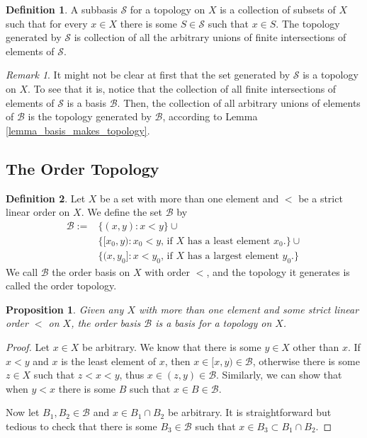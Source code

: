 \documentclass{article}
\newtheorem{proposition}{Proposition}[subsection]
\theoremstyle{definition}
\newtheorem{definition}{Definition}[subsection]
\theoremstyle{remark}
\newtheorem{remark}{Remark}[subsection]
\newcommand{\set}[1]{\{#1\}}
\newcommand{\prt}[1]{\mathcal{#1}}
\begin{document}
\begin{definition}\label{def_subbasis}
    A subbasis $\prt{S}$ for a topology on $X$ is a collection of subsets of $X$ such that for every $x \in X$ there is some $S \in \prt{S}$ such that $x \in S$. The topology generated by $\prt{S}$ is collection of all the arbitrary unions of finite intersections of elements of $\prt{S}$.
\end{definition}

\begin{remark}
     It might not be clear at first that the set generated by $\prt{S}$ is a topology on $X$. To see that it is, notice that the collection of all finite intersections of elements of $\prt{S}$ is a basis $\prt{B}$. Then, the collection of all arbitrary unions of elements of $\prt{B}$ is the topology generated by $\prt{B}$, according to Lemma \ref{lemma_basis_makes_topology}.
\end{remark}

\subsection{The Order Topology}

\begin{definition}\label{def_order_basis}
    Let $X$ be a set with more than one element and $<$ be a strict linear order on $X$. We define the set $\prt{B}$ by 
    \begin{align*}
        \prt{B} := &\set{(x, y) : x < y} \cup \\ &\set{[x_0, y) : x_0 < y\text{, if $X$ has a least element $x_0$.}} \cup \\ 
        &\set{(x, y_0] : x < y_0\text{, if $X$ has a largest element $y_0$.}}
    \end{align*}
    We call $\prt{B}$ the order basis on $X$ with order $<$, and the topology it generates is called the order topology.
\end{definition}

\begin{proposition}
    Given any $X$ with more than one element and some strict linear order $<$ on $X$, the order basis $\prt{B}$ is a basis for a topology on $X$.
\end{proposition}

\begin{proof}
    Let $x \in X$ be arbitrary. We know that there is some $y \in X$ other than $x$. If $x < y$ and $x$ is the least element of $x$, then $x \in [x, y) \in \prt{B}$, otherwise there is some $z \in X$ such that $z < x < y$, thus $x \in (z, y) \in \prt{B}$. Similarly, we can show that when $y < x$ there is some $B$ such that $x \in B \in \prt{B}$.
    
    Now let $B_1, B_2 \in \prt{B}$ and $x \in B_1 \cap B_2$ be arbitrary. It is straightforward but tedious to check that there is some $B_3 \in \prt{B}$ such that $x \in B_3 \subset B_1 \cap B_2$.
\end{proof}
\end{document}
